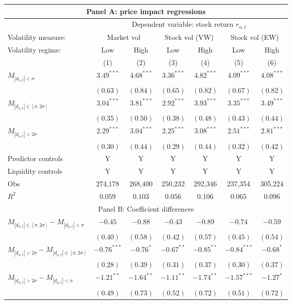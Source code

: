 \begin{tabular}{lcccccc}
  \hline \multicolumn{7}{c}{Panel A: price impact regressions} \\
 \hline
                                    & \multicolumn{6}{c}{Dependent variable: stock return $r_{n,t}$} \\

                                    \cmidrule(l){2-7} Volatility measure: & \multicolumn{2}{c}{Market vol} & \multicolumn{2}{c}{Stock vol (VW)} & \multicolumn{2}{c}{Stock vol (EW)} \\
 \cmidrule(l){2-3} \cmidrule(l){4-5} \cmidrule(l){6-7} Volatility regime: & Low & High & Low & High & Low & High \\
 \cmidrule(l){2-3} \cmidrule(l){4-5} \cmidrule(l){6-7} 
  & (1) & (2) & (3) & (4) & (5) & (6) \\ 
  $M_{|d_{n,t}| < \sigma}$ & $3.49^{***}$ & $4.68^{***}$ & $3.36^{***}$ & $4.82^{***}$ & $4.09^{***}$ & $4.08^{***}$ \\ 
   & $(0.63)$ & $(0.84)$ & $(0.65)$ & $(0.82)$ & $(0.67)$ & $(0.82)$ \\ 
  $M_{|d_{n,t}| \in [\sigma, 2\sigma]}$ & $3.04^{***}$ & $3.81^{***}$ & $2.92^{***}$ & $3.93^{***}$ & $3.35^{***}$ & $3.49^{***}$ \\ 
   & $(0.35)$ & $(0.50)$ & $(0.38)$ & $(0.48)$ & $(0.43)$ & $(0.44)$ \\ 
  $M_{|d_{n,t}| > 2 \sigma}$ & $2.29^{***}$ & $3.04^{***}$ & $2.25^{***}$ & $3.08^{***}$ & $2.51^{***}$ & $2.81^{***}$ \\ 
   \vspace{5pt} & $(0.30)$ & $(0.44)$ & $(0.29)$ & $(0.44)$ & $(0.32)$ & $(0.42)$ \\ 
  Predictor controls & Y & Y & Y & Y & Y & Y \\ 
   \vspace{5pt}Liquidity controls & Y & Y & Y & Y & Y & Y \\ 
  Obs & 274,178 & 268,400 & 250,232 & 292,346 & 237,354 & 305,224 \\ 
  $R^2$ & $0.059$ & $0.103$ & $0.056$ & $0.106$ & $0.065$ & $0.096$ \\ 
   \hline \multicolumn{7}{c}{Panel B: Coefficient differences} \\
 \hline$M_{|d_{n,t}| \in [\sigma, 2\sigma]} - M_{|d_{n,t}| < \sigma}$ & $-0.45$ & $-0.88$ & $-0.43$ & $-0.89$ & $-0.74$ & $-0.59$ \\ 
   & $(0.40)$ & $(0.58)$ & $(0.42)$ & $(0.57)$ & $(0.45)$ & $(0.54)$ \\ 
  $M_{|d_{n,t}| > 2 \sigma} - M_{|d_{n,t}| \in [\sigma, 2\sigma]}$ & $-0.76^{***}$ & $-0.76^{*}$ & $-0.67^{**}$ & $-0.85^{**}$ & $-0.84^{***}$ & $-0.68^{*}$ \\ 
   & $(0.28)$ & $(0.39)$ & $(0.31)$ & $(0.37)$ & $(0.30)$ & $(0.37)$ \\ 
  $M_{|d_{n,t}| > 2 \sigma} - M_{|d_{n,t}| < \sigma}$ & $-1.21^{**}$ & $-1.64^{**}$ & $-1.11^{**}$ & $-1.74^{**}$ & $-1.57^{***}$ & $-1.27^{*}$ \\ 
   & $(0.49)$ & $(0.73)$ & $(0.52)$ & $(0.72)$ & $(0.51)$ & $(0.72)$ \\ 
   \hline 
\end{tabular}
